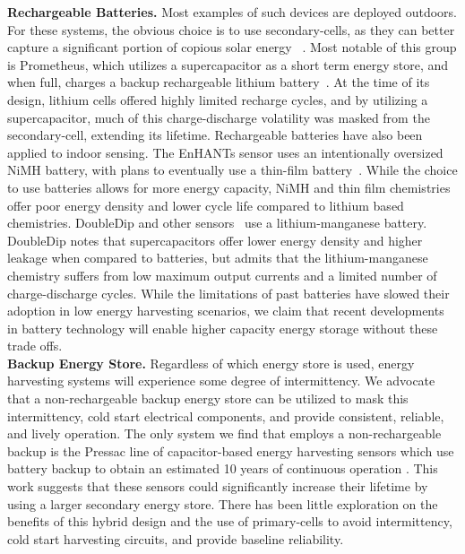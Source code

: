 \vspace{-6pt}
\noindent
\textbf{Rechargeable Batteries.}
Most examples of such devices are deployed outdoors.
For these systems, the obvious choice is to use secondary-cells, as they can
better capture a significant portion of copious solar energy
~\cite{jiang2005perpetual, kansal2007power, corke2007long, lin2005heliomote, adkins2018signpost}.
Most notable of this group is Prometheus,
which utilizes a supercapacitor as a short term energy store, and when full,
charges a backup rechargeable lithium battery~\cite{jiang2005perpetual}. At
the time of its design, lithium cells offered highly limited recharge cycles,
and by utilizing a supercapacitor, much of this
charge-discharge volatility was masked from the secondary-cell, extending its lifetime.
Rechargeable batteries have also been applied to indoor sensing.
The EnHANTs sensor uses an intentionally oversized NiMH
battery, with plans to eventually use a thin-film battery~\cite{margolies2015energy}.
While the choice to use batteries allows for more energy capacity,
NiMH and thin film chemistries offer poor
energy density and lower cycle life compared to lithium
based chemistries. DoubleDip and other sensors~\cite{martin2012doubledip,raisigel2010autonomous} use a
lithium-manganese battery.  DoubleDip notes that supercapacitors offer
lower energy density and higher leakage when compared to batteries, but admits
that the lithium-manganese chemistry suffers from low maximum output currents
and a limited number of charge-discharge cycles.
While the limitations of past batteries have slowed their adoption in
low energy harvesting scenarios, we claim that recent developments in battery
technology will enable higher capacity energy storage without these trade offs.
\\

\vspace{-6pt}
\noindent
\textbf{Backup Energy Store.}
Regardless of which energy store is used, energy harvesting systems will
experience some degree of intermittency. We advocate that a non-rechargeable
backup energy store can be utilized to mask this intermittency, cold
start electrical components, and provide consistent, reliable, and lively operation.
The only system we find that employs a non-rechargeable
backup is the Pressac line of capacitor-based energy harvesting sensors which
use battery backup to obtain an estimated 10 years of continuous operation
\cite{pressac}.  This work suggests that these sensors could significantly
increase their lifetime by using a larger secondary energy store.
There has been little
exploration on the benefits of this hybrid design and the use of
primary-cells to avoid intermittency, cold start harvesting circuits,
and provide baseline reliability.


